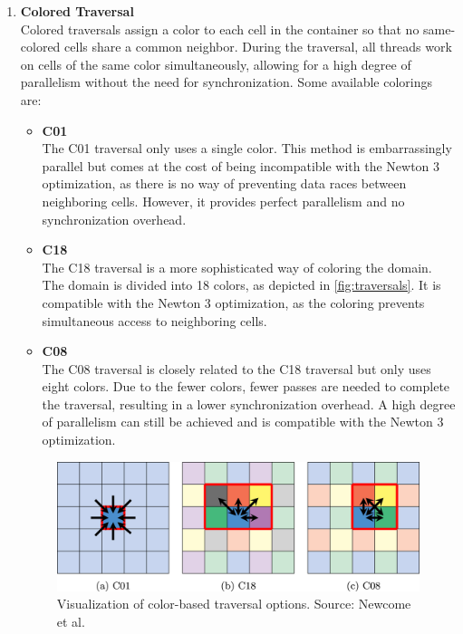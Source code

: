 \begin{enumerate}[label=\textbf{\arabic*.}]
\begin{enumerate}
                  \item \textbf{Colored Traversal} \\
                        Colored traversals assign a color to each cell in the container so that no same-colored cells share a common neighbor.
                        During the traversal, all threads work on cells of the same color simultaneously, allowing for a high degree of parallelism without the need for synchronization. Some available colorings are:
                        \begin{itemize}
                              \item \textbf{C01} \\
                                    The C01 traversal only uses a single color. This method is embarrassingly parallel but comes at the cost of being incompatible with the Newton 3 optimization, as there is no way of preventing data races between neighboring cells. However, it provides perfect parallelism and no synchronization overhead.

                              \item \textbf{C18} \\
                                    The C18 traversal is a more sophisticated way of coloring the domain. The domain is divided into 18 colors, as depicted in \autoref{fig:traversals}. It is compatible with the Newton 3 optimization, as the coloring prevents simultaneous access to neighboring cells.

                              \item \textbf{C08} \\
                                    The C08 traversal is closely related to the C18 traversal but only uses eight colors. Due to the fewer colors, fewer passes are needed to complete the traversal, resulting in a lower synchronization overhead. A high degree of parallelism can still be achieved and is compatible with the Newton 3 optimization.\\
                        \end{itemize}

                        \begin{figure}[H]
                              \centering
                              \includegraphics[width=0.7\columnwidth]{figures/Intro/traversals.jpg}
                              \caption[Visualization of different color-based traversal options in AutoPas.]                             {Visualization of color-based traversal options. \small{Source: Newcome et al.~\cite{Newcome2023}}}
                              \label{fig:traversals}
                        \end{figure}


\end{enumerate}
\end{enumerate}
